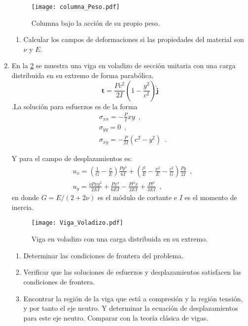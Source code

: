 \documentclass[../notas medios.tex]{subfiles}
\begin{document}
\begin{enumerate}
\begin{figure}[h]
	\centering
	\texttt{[image: columna\_Peso.pdf]} 
	\caption{Columna bajo la acción de su propio peso.}
	\label{fig:columna_g}
\end{figure}

\begin{enumerate}
\item Calcular los campos de deformaciones si las propiedades del material son $\nu$ y $E$.
\end{enumerate}
\newpage
\item \label{punto04_m}En la  \cref{fig:viga} se muestra una viga en voladizo de sección unitaria con una carga distribuida en su extremo de forma parabólica.
\[\mathbf{t} = \frac{Pc^2}{2I}\left(1-\frac{y^2}{c^2}\right)\hat{\mathbf{j}}\].La solución para esfuerzos es de la forma
\begin{align*}
&\sigma_{xx} = -\frac{P}{I}xy \enspace ,\\
&\sigma_{yy} = 0 \enspace ,\\
&\sigma_{xy} = -\frac{P}{2I}(c^2 - y^2) \enspace .
\end{align*}

Y para el campo de desplazamientos es:
\begin{align*}
&u_{x} = \left(\frac{1}{G} - \frac{\nu}{E}\right)\frac{Py^3}{6I} + \left(\frac{l^2}{E} - \frac{x^2}{E} - \frac{c^2}{G} \right)\frac{Py}{2I} \enspace ,\\
&u_{y} = \frac{\nu P xy^2}{2EI} + \frac{Px^3}{6EI} - \frac{Pl^2x}{2EI} + \frac{Pl^3}{3EI} \enspace ,
\end{align*}
en donde $G=E/(2 + 2\nu)$ es el módulo de cortante e $I$ es el momento de inercia.

\begin{figure}[h]
	\centering
	\texttt{[image: Viga\_Voladizo.pdf]} 
	\caption{Viga en voladizo con una carga distribuida en su extremo.}
	\label{fig:viga}
\end{figure}

\begin{enumerate}
\item Determinar las condiciones de frontera del problema.
\item Verificar que las soluciones de esfuerzos y desplazamientos satisfacen las condiciones de frontera.
\item Encontrar la región de la viga que está a compresión y la región tensión, y por tanto el eje neutro. Y determinar la ecuación de desplazamientos para este eje neutro. Comparar con la teoría clásica de vigas.
\end{enumerate}


\end{enumerate}
\end{document}
